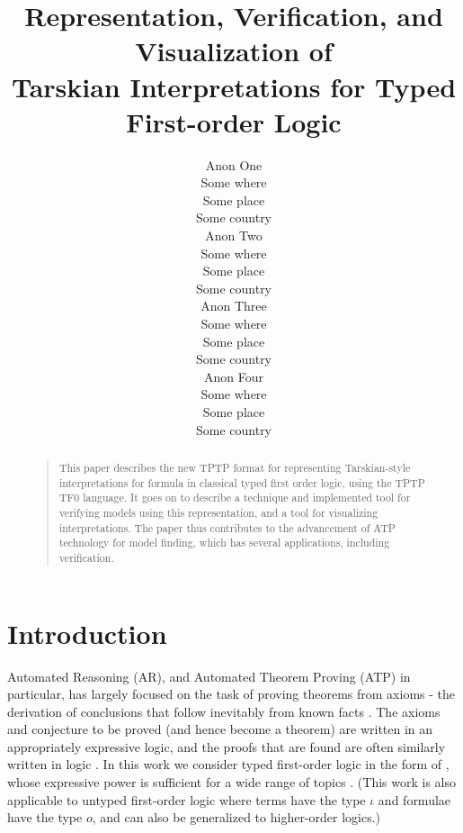 \documentclass[letterpaper]{article}
\begin{document}

\title{Representation, Verification, and Visualization of\\
Tarskian Interpretations for Typed First-order Logic}
\author{Anon One\\
Some where\\
Some place\\
Some country\\
\And
Anon Two\\
Some where\\
Some place\\
Some country\\
\And
Anon Three\\
Some where\\
Some place\\
Some country\\
\And
Anon Four\\
Some where\\
Some place\\
Some country}

\maketitle
\begin{abstract}
\begin{quote}
This paper describes the new TPTP format for representing Tarskian-style interpretations for
formula in classical typed first order logic, using the TPTP TF0 language.
It goes on to describe a technique and implemented tool for verifying models using this
representation, and a tool for visualizing interpretations.
The paper thus contributes to the advancement of ATP technology for model finding, which has
several applications, including verification.
\end{quote}
\end{abstract}
\section{Introduction}
\label{Introduction}

Automated Reasoning (AR), and Automated Theorem Proving (ATP) in particular, has largely focused
on the task of proving theorems from axioms - the derivation of conclusions that follow inevitably 
from known facts \cite{RV01-HAR}.
The axioms and conjecture to be proved (and hence become a theorem) are written in an 
appropriately expressive logic, and the proofs that are found are often similarly written in
logic \cite{SS+06}.
In this work we consider typed first-order logic in the form of \cite{Wal83,Sch85,Coh87},
whose expressive power is sufficient for a wide range of topics \cite{Sut17}.
(This work is also applicable to untyped first-order logic where terms have the type $\iota$ 
and formulae have the type $o$, and can also be generalized to higher-order logics.)
\end{document}
